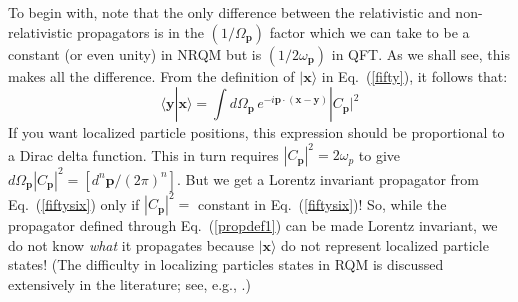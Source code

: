 \documentclass{article}
\def\eq#1{{Eq.~(\ref{#1})}}
\def\ket#1{|#1\rangle}                    %
\def\amp#1#2{\langle #1 | #2\rangle}      %
\begin{document}
To begin with, note that the only difference between the relativistic and non-relativistic propagators is in the  $(1/\Omega_{\bm{p}})$ factor which we can take to be a constant (or even unity) in NRQM but is $(1/2\omega_{\bm{p}})$ in QFT. As we shall see, this makes all the difference.
 From the definition of $\ket{\bm{x}}$ in \eq{fifty}, it follows that:
 \begin{equation}
  \amp{\bm{y}}{\bm{x}} = \int d\Omega_{\bm{p}}  \, e^{-i\bm{p \cdot (x-y)}} |C_{\bm {p}}|^2
  \label{fiftytwo1}
\end{equation} 
If you want localized particle positions, this expression should be proportional to a Dirac delta function. This in turn requires $|C_{\bm {p}}|^2=2\omega_p$ to give $d\Omega_{\bm{p}}|C_{\bm {p}}|^2=[d^n\bm{p}/(2\pi)^n]$. But we get a Lorentz invariant propagator from \eq{fiftysix} only if $|C_{\bm {p}}|^2=$ constant in \eq{fiftysix}! So, while the propagator defined through \eq{propdef1} can be made Lorentz invariant, we do not know \textit{what} it propagates because $\ket{\bm{x}}$ do not represent localized particle states! (The difficulty in localizing particles states in RQM is discussed extensively in the literature; see, e.g., \cite{F,F12,F13,F14,F15}.)
\end{document}
